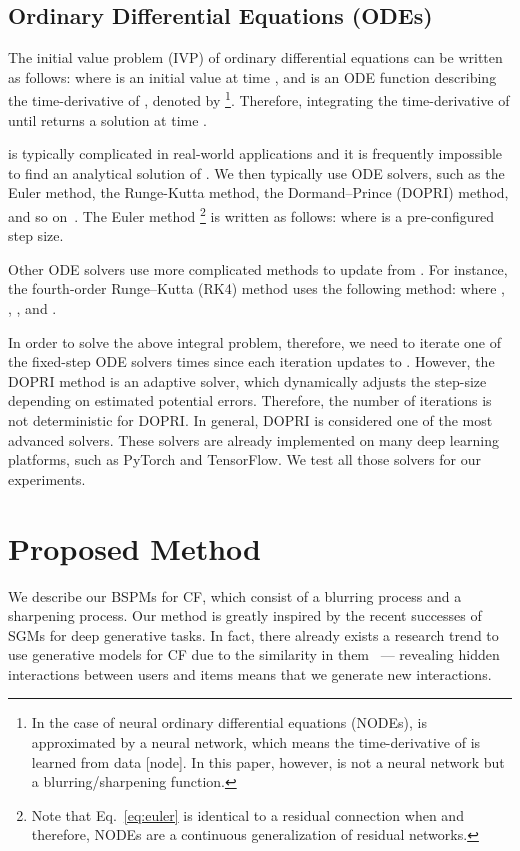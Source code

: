 \documentclass[sigconf,natbib=true]{acmart}
\begin{document}
\subsection{Ordinary Differential Equations (ODEs)}\label{sec:solver}
The initial value problem (IVP) of ordinary differential equations can be written as follows:
where  is an initial value at time , and  is an ODE function describing the time-derivative of , denoted by \footnote{In the case of neural ordinary differential equations (NODEs),  is approximated by a neural network, which means the time-derivative of  is learned from data [node]. In this paper, however,  is not a neural network but a blurring/sharpening function.}. Therefore, integrating the time-derivative of  until  returns a solution  at time .

 is typically complicated in real-world applications and it is frequently impossible to find an analytical solution of . We then typically use ODE solvers, such as the Euler method, the Runge-Kutta method, the Dormand--Prince (DOPRI) method, and so on~\cite{dormand1980dopri}. The Euler method \footnote{Note that Eq.~\eqref{eq:euler} is identical to a residual connection when  and therefore, NODEs are a continuous generalization of residual networks.} is written as follows:
where  is a pre-configured step size.


Other ODE solvers use more complicated methods to update  from . For instance, the fourth-order Runge--Kutta (RK4) method uses the following method:
where , , , and .

In order to solve the above integral problem, therefore, we need to iterate one of the fixed-step ODE solvers  times since each iteration updates  to . However, the DOPRI method is an adaptive solver, which dynamically adjusts the step-size  depending on estimated potential errors. Therefore, the number of iterations is not deterministic for DOPRI. In general, DOPRI is considered one of the most advanced solvers. 
These solvers are already implemented on many deep learning platforms, such as PyTorch and TensorFlow. We test all those solvers for our experiments.

\section{Proposed Method}
We describe our BSPMs for CF, which consist of a blurring process and a sharpening process. Our method is greatly inspired by the recent successes of SGMs for deep generative tasks. In fact, there already exists a research trend to use generative models for CF due to the similarity in them~\cite{Wang2017IRGAN,Chae2018CFGAN,Wang2018GraphGAN,Chae2019RAGANBT,Wang2019AugCF,Sun2020LARA,Chen2021TagRec} --- revealing hidden interactions between users and items means that we generate new interactions.
\end{document}
